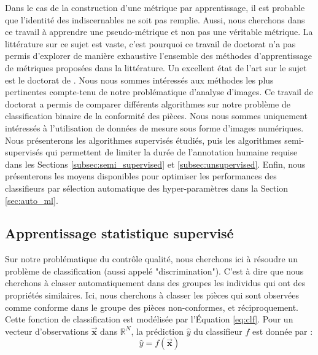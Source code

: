 Dans le cas de la construction d'une métrique par apprentissage, il est probable que l'identité des indiscernables ne soit pas remplie.
Aussi, nous cherchons dans ce travail à apprendre une pseudo-métrique et non pas une véritable métrique.
La littérature sur ce sujet est vaste, c'est pourquoi ce travail de doctorat n'a pas permis d'explorer de manière exhaustive l'ensemble des méthodes d'apprentissage de métriques proposées dans la littérature.
Un excellent état de l'art sur le sujet est le doctorat de \citeauthor{bellet_supervised_2012} \cite{bellet_supervised_2012}.
Nous nous sommes intéressés aux méthodes les plus pertinentes compte-tenu de notre problématique d'analyse d'images.
Ce travail de doctorat a permis de comparer différents algorithmes sur notre problème de classification binaire de la conformité des pièces.
Nous nous sommes uniquement intéressés à l'utilisation de données de mesure sous forme d'images numériques.
Nous présenterons les algorithmes supervisés étudiés, puis les algorithmes semi-supervisés qui permettent de limiter la durée de l'annotation humaine requise dans les Sections \ref{subsec:semi_supervised} et \ref{subsec:unsupervised}.
Enfin, nous présenterons les moyens disponibles pour optimiser les performances des classifieurs par sélection automatique des hyper-paramètres dans la Section \ref{sec:auto_ml}.

\subsection{Apprentissage statistique supervisé}
Sur notre problématique du contrôle qualité, nous cherchons ici à résoudre un problème de classification (aussi appelé "discrimination").
C'est à dire que nous cherchons à classer automatiquement dans des groupes les individus qui ont des propriétés similaires.  %
Ici, nous cherchons à classer les pièces qui sont observées comme conforme dans le groupe des pièces non-conformes, et réciproquement.
Cette fonction de classification est modélisée par l'Équation \ref{eq:clf}.
Pour un vecteur d'observations $\vec{\mathbf{x}}$ dans $\mathbb {R}^{N}$, la prédiction $\hat{y}$ du classifieur $f$ est donnée par :
\begin{equation} \label{eq:clf}
\hat{y} = f\left(\vec{\mathbf{x}}\right)
\end{equation}

